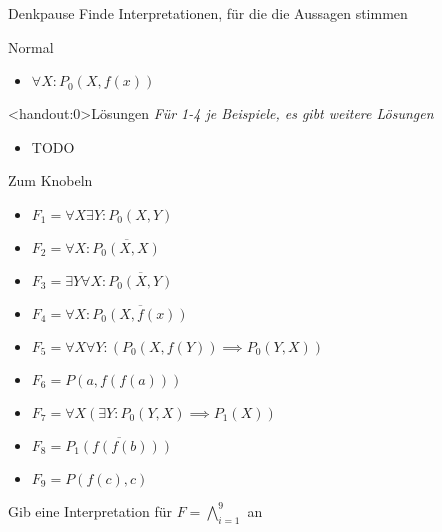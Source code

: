 {
\begin{frame}{Denkpause}
    Finde Interpretationen, für die die Aussagen stimmen
    \begin{block}{Normal}
        \begin{itemize}
            \item $\forall X: {P_0(X,f(x))}$
        \end{itemize}
    \end{block}
\end{frame}

\begin{frame}<handout:0>{Lösungen}
    \textit{Für 1-4 je Beispiele, es gibt weitere Lösungen}
    \begin{itemize}[<+- | alert@+>]
        \item TODO
    \end{itemize}

\end{frame}

\begin{frame}{Zum Knobeln}
    \small
    \begin{block}{}
        \begin{multicols}{2}
            \begin{itemize}
                \item $F_1 = \forall X \exists Y: P_0(X,Y)$
                \item $F_2 = \forall X: \overline{P_0(X,X)}$
                \item $F_3 = \exists Y \forall X: \overline{P_0(X,Y)}$
                \item $F_4 = \forall X: \overline{P_0(X,f(x))}$
                \item {\scriptsize$F_5 = \forall X \forall Y: (P_0(X,f(Y)) \implies P_0(Y,X))$}
                \item $F_6 = P(a, f(f(a)))$
                \item $F_7 = \forall X (\exists Y: P_0(Y,X)\implies P_1(X))$
                \item $F_8 = \overline{P_1(f(f(b)))}$
                \item $F_9 = P(f(c),c)$
            \end{itemize}
        \end{multicols}
        Gib eine Interpretation für $F = \bigwedge_{i=1}^9$ an
    \end{block}
\end{frame}
}